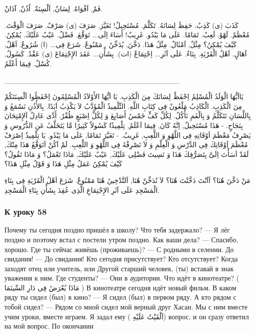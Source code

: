\documentclass[a5paper]{article}
\begin{document}
فَمٌ, اَفْوَاهٌ. لِسَانٌ, اَلْسِنَةٌ. اُذُنٌ, آذَانٌ.

كَذَبَ (ى) كَذِبٌ. حَفِظَ لِسَانَهُ. تَكَلَّمَ. مُسْتَحِيلٌ! تَغَيَّرَ. صَرَفَ (ى) صَرْفٌ. صَرَفَ الْوَقْتَ. مُعْظَمٌ. لَهْوٌ. لَعِبٌ. تَمَامًا. عَلَى مَا يَبْدُو. غَرِيبٌ! أَسَاءَ اِلَى... تَوَقَّعَ. فَضْلٌ. عَيْبٌ عَلَيْكَ. يُمْكِنُ. كَيْفَ يُمْكِنُ؟ مِثْلٌ, اَمْثَالٌ. مِثْلُ هَذَا. دَخَّنَ, يُدَخِّنُ . مَمْنُوعٌ. شَرَعَ فِى... (ا) شُرُوعٌ. اَهْلٌ, اَهَالٍ. اَهْلُ الْقَرْيَةِ. بِنَاءٌ. عَلَى اَثَرِ... اِجْتِمَاعٌ (ات). بِشَأْنِ... عَقَدَ الإِجْتِمَاعَ (ى) عَقْدٌ. كَسُولٌ, كُسْلٌ. فِيمَا أَعْلَمُ. 

\_\_\_\_\_\_\_\_\_\_\_\_\_\_\_\_\_\_\_\_\_\_\_\_\_\_\_\_\_\_\_\_\_\_

يَااَيُّهَا الْوَلَدُ الْمُسْلِمُ اِحْفَظْ لِسَانَكَ مِنَ الْكَذِبِ. يَا اَيُّهَا الأَوْلاَدُ الْمُسْلِمُونَ اِحْفَظُوا اَلْسِنَتَكُمْ مِنَ الْكَذِبِ. الْكَاذِبُ مَلْعُونٌ فِى كِتَابِ اللَّهِ. التِّلْمِيذُ الْمُؤَدَّبُ لاَ يَكْذِبُ اَبَدًا. بِالأُذُنِ نَسْمَعُ وَ بِاللِّسَانِ نَتَكَلَّمُ وَ بِالْفَمِ نَأْكُلُ. لِكُلِّ كَفٍّ خَمْسُ أَصَابِعَ وَ لِكُلِّ اِصْبَعٍ ظُفْرٌ. أَدَّى عَادِلٌ اَلإِمْتِحَانَ بِنَجَاحٍ. - هَذَا مُسْتَحِيلٌ, اِنَّهُ كَانَ, فِيمَا اَعْلَمُ, تِلْمِيذًا كَسُولاً كَثِيرًا مَّا يَتَخَلَّفُ عَنِ الدُّرُوسِ وَ يَصْرِفُ مَعْظَمَ اَوْقَاتِهِ فِى اللَّهْوِ وَ اللَّعِبِ, غَرِيبٌ. - تَغَيَّرَ تَمَامًا, عَلَى مَا يَبْدُو. يَا تِلْمِيذُ اِصْرَفْ مُعْظَمَ اَوْقَاتِكَ فِى الدَّرْسِ وَ الْعِلْمِ وَ لاَ تَصْرِفْهُ فِى اللَّهْوِ وَ اللَّعِبِ. لَمْ اَكُنْ اَتَوَقَّعُ هَذَا مِنْكَ, لَقَدْ اَسَأْتَ اِلَىَّ بِتَصَرُّفِكَ هَذَا وَ نَسِيتَ فَضْلِى عَلَيْكَ, عَيْبٌ عَلَيْكَ, مَاذَا تَعْمَلُ؟ وَ مَاذَا تَقُولُ؟ كَيْفَ يُمْكِنُ عَمَلُ مِثْلِ هَذَا وَ قَوْلُ مِثْلِ هَذَا؟

مَنْ دَخَّنَ هُنَا؟ اَاَنْتَ دَخَّنْتَ هُنَا؟ لاَ تُدَخِّنْ هُنَا, اَلتَّدْخِينُ هُنَا مَمْنُوعٌ. شَرَعَ اَهْلُ الْقَرْيَةِ فِى بِنَاءِ الْمَسْجِدِ عَلَى اَثَرِ الإِجْتِمَاعِ الَّذِى عُقِدَ بِشَأْنِ بِنَاءِ الْمَسْجِدِ.

\subsubsection{К уроку 58}
Почему ты сегодня поздно пришёл в школу? Что тебя задержало? — Я лёг поздно и поэтому встал с постели утром поздно. Как ваши дела? — Спасибо, хорошо. Где ты сейчас живёшь (проживаешь)? — С родными в селении. До свидания! — До свидания! Кто сегодня присутствует? Кто отсутствует? Когда заходят отец или учитель, или Другой старший человек, (ты) вставай в знак уважения к ним. Где студенты? — Они в аудитории. Что идёт в кинотеатре? ( مَاذَا يُعْرَضُ فِى دَارِ السِّينَمَا ) В кинотеатре сегодня идёт новый фильм. В каком ряду ты сидел (был) в кино? — Я сидел (был) в первом ряду. А кто рядом с тобой сидел? — Рядом со мной сидел мой верный друг Хасан. Мы с ним вместе учим уроки, вместе играем. Я задал ему ( اَلْقَيْتُ عَلَيْهِ) вопрос, и он сразу ответил на мой вопрос. По окончании
\end{document}
